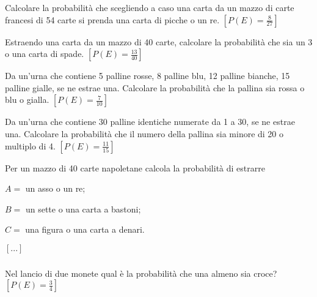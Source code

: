 \begin{esercizio}[\Ast]
 \label{ese:9.32}
Calcolare la probabilità che scegliendo a caso una carta da un mazzo di carte 
francesi di 54 carte si prenda una carta di picche o un re.
\hfill $\left[P(E)=\frac 8{27}\right]$
\end{esercizio}

\begin{esercizio}[\Ast]
 \label{ese:9.33}
Estraendo una carta da un mazzo di 40 carte, calcolare la probabilità che sia un 
3 o una carta di spade.
\hfill $\left[P(E)=\frac{13}{40}\right]$
\end{esercizio}

\begin{esercizio}[\Ast]
 \label{ese:9.34}
 Da un'urna che contiene 5 palline rosse, 8 palline blu, 12 palline bianche, 15 
palline gialle, se ne estrae una. Calcolare la probabilità che la pallina sia 
rossa o blu o gialla.
\hfill $\left[P(E)=\frac 7{10}\right]$
\end{esercizio}

\begin{esercizio}[\Ast]
 \label{ese:9.35}
Da un'urna che contiene 30 palline identiche numerate da 1 a 30, se ne estrae 
una. Calcolare la probabilità che il numero della pallina sia minore di 20 o 
multiplo di 4.
\hfill $\left[P(E)=\frac{11}{15}\right]$
\end{esercizio}

\begin{esercizio}
 \label{ese:9.36}
Per un mazzo di 40 carte napoletane calcola la probabilità di estrarre
\begin{itemize*}
\item $ A= $ un asso o un re;
\item $ B= $ un sette o una carta a bastoni;
\item $ C= $ una figura o una carta a denari.
\end{itemize*}
\hfill $\left[...\right]$
\end{esercizio}

\subsubsection*{}


\begin{esercizio}[\Ast]
 \label{ese:9.47}
Nel lancio di due monete qual è la probabilità che una almeno sia croce?
\hfill $\left[P(E)=\frac 3 4\right]$
\end{esercizio}

